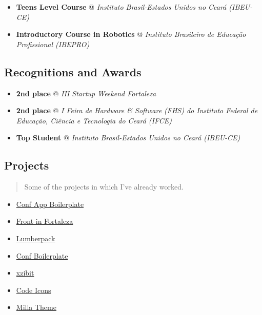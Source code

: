 \documentclass[]{article}
\providecommand{\tightlist}{%
  \setlength{\itemsep}{0pt}\setlength{\parskip}{0pt}}
\begin{document}
\begin{itemize}
\item
  \textbf{Teens Level Course} @ \emph{Instituto Brasil-Estados Unidos no
  Ceará (IBEU-CE)}
\item
  \textbf{Introductory Course in Robotics} @ \emph{Instituto Brasileiro
  de Educação Profissional (IBEPRO)}
\end{itemize}

\subsection{Recognitions and Awards}\label{recognitions-and-awards}

\begin{itemize}
\item
  \textbf{2nd place} @ \emph{III Startup Weekend Fortaleza}
\item
  \textbf{2nd place} @ \emph{I Feira de Hardware \& Software (FHS) do
  Instituto Federal de Educação, Ciência e Tecnologia do Ceará (IFCE)}
\item
  \textbf{Top Student} @ \emph{Instituto Brasil-Estados Unidos no Ceará
  (IBEU-CE)}
\end{itemize}

\subsection{Projects}\label{projects}

\begin{quote}
Some of the projects in which I've already worked.
\end{quote}

\begin{itemize}
\tightlist
\item
  \href{https://github.com/devevents/conf-app-boilerplate}{Conf App
  Boilerplate}
\item
  \href{https://play.google.com/store/apps/details?id=com.devevents.frontinfortaleza}{Front
  in Fortaleza}
\item
  \href{https://github.com/mabrasil/lumberpack}{Lumberpack}
\item
  \href{https://github.com/mabrasil/conf-boilerplate}{Conf Boilerplate}
\item
  \href{https://github.com/mabrasil/xzibit}{xzibit}
\item
  \href{https://github.com/mabrasil/codeicons}{Code Icons}
\item
  \href{https://github.com/mabrasil/milla-theme}{Milla Theme}
\end{itemize}
\end{document}
